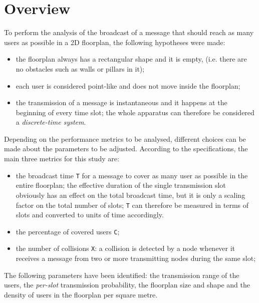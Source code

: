 %
\chapter{Overview}\label{ch:overview}
To perform the analysis of the broadcast of a message that should reach as many
users as possible in a 2D floorplan, the following hypotheses were made:
\begin{itemize}
	\item the floorplan always has a rectangular shape and it is empty, (i.e.
	there are no obstacles such as walls or pillars in it);
	\item each user is considered point-like and does not move inside the
	floorplan;
	\item the transmission of a message is instantaneous and it happens at the
	beginning of every time slot; the whole apparatus can therefore be
	considered a \textit{discrete-time system}.
\end{itemize}
Depending on the performance metrics to be analysed, different choices can be
made about the parameters to be adjusted. According to the specifications, the
main three metrics for this study are:
\begin{itemize}
	\item the broadcast time \colorbox{gray!30}{\large \texttt{T}} for a message
	to cover as many user as possible in the entire floorplan; the effective
	duration of the single transmission slot obviously has an effect
	on the total broadcast time, but it is only a scaling factor on the total
	number of slots; \texttt{T} can therefore be measured in terms of slots and
	converted to units of time accordingly.
	\item the percentage of covered users \colorbox{gray!30}{\large \texttt{C}};
	\item the number of collisions \colorbox{gray!30}{\large \texttt{X}}:
	a collision is detected by a node whenever it receives a message from two or
	more transmitting nodes during the same slot;
\end{itemize}
The following parameters have been identified: the transmission range of the
users, the \textit{per-slot} transmission probability, the floorplan size and
shape and the density of users in the floorplan per square metre.\\
